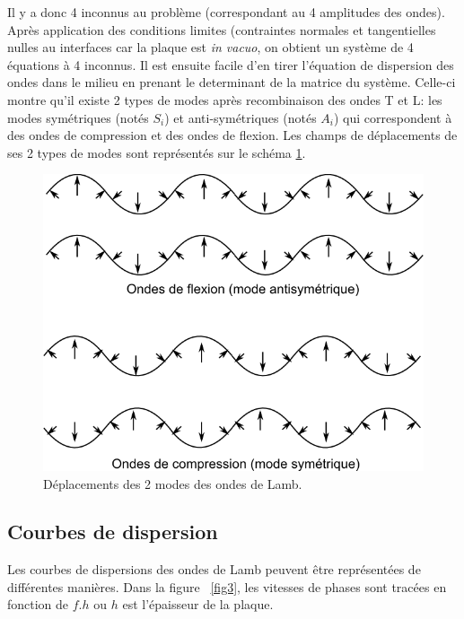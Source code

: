 \documentclass[twoside]{article}
\begin{document}
\begin{multicols}{2}
Il y a donc 4 inconnus au problème (correspondant au 4 amplitudes des ondes). Après application des conditions limites (contraintes normales et tangentielles nulles au interfaces car la plaque est \emph{in vacuo}, on obtient un système de 4 équations à 4 inconnus. Il est ensuite facile d'en tirer l'équation de dispersion des ondes dans le milieu en prenant le determinant de la matrice du système. Celle-ci montre qu'il existe 2 types de modes après recombinaison des ondes T et L: les modes symétriques (notés $S_i$) et anti-symétriques (notés $A_i$) qui correspondent à des ondes de compression et des ondes de flexion. Les champs de déplacements de ses 2 types de modes sont représentés sur le schéma \ref{fig2}.

\begin{figure}[H]
\centering
\includegraphics[scale=0.4]{./images/modes.png}
\caption{\label{fig2} Déplacements des 2 modes des ondes de Lamb.}
\end{figure}


\subsection{Courbes de dispersion}

Les courbes de dispersions des ondes de Lamb peuvent être représentées de différentes manières. Dans la figure ~\ref{fig3}, les vitesses de phases sont tracées en fonction de $f.h$ ou $h$ est l'épaisseur de la plaque. 


\end{multicols}
\end{document}
